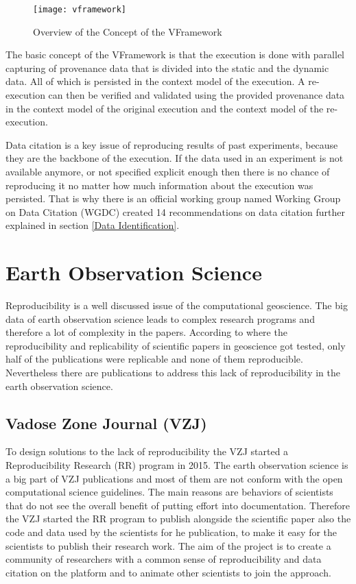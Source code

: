 \documentclass[draft,final]{vutinfth} %
\begin{document}
\begin{figure}[h]
	\centering
	\texttt{[image: vframework]}
	\caption{Overview of the Concept of the VFramework \cite{Miksa2013FrameworkFV}}
	\label{fig:vframework} %
\end{figure}

The basic concept of the VFramework is that the execution is done with parallel capturing of provenance data that is divided into the static and the dynamic data. All of which is persisted in the context model of the execution. A re-execution can then be verified and validated using the provided provenance data in the context model of the original execution and the context model of the re-execution.\cite{Miksa2013FrameworkFV}

Data citation is a key issue of reproducing results of past experiments, because they are the backbone of the execution. If the data used in an experiment is not available anymore, or not specified explicit enough then there is no chance of reproducing it no matter how much information about the execution was persisted. 
That is why there is an official working group named Working Group on Data Citation (WGDC) created 14 recommendations on data citation further explained in section \ref{Data Identification}.

\section{Earth Observation Science}\label{EOScience}

Reproducibility is a well discussed issue of the computational geoscience. The big data of earth observation science leads to complex research programs and therefore a lot of complexity in the papers.  According to \cite{Ostermann2017AdvancingSW} where the reproducibility and replicability of scientific papers in geoscience got tested, only half of the publications were replicable and none of them reproducible. Nevertheless there are publications to address this lack of reproducibility in the earth observation science. 

\subsection{Vadose Zone Journal (VZJ)}\label{VZJ}
To design solutions to the lack of reproducibility the VZJ started a Reproducibility Research (RR) program in 2015. \cite{doi:10.2136/vzj2015.06.0088}
The earth observation science is a big part of VZJ publications and most of them are not conform with the open computational science guidelines. The main reasons are behaviors of scientists that do not see the overall benefit of putting effort into documentation. Therefore the VZJ started the RR program to publish alongside the scientific paper also the code and data used by the scientists for he publication, to make it easy for the scientists to publish their research work. The aim of the project is to create a community of researchers with a common sense of reproducibility and data citation on the platform and to animate other scientists to join the approach. \cite{doi:10.2136/vzj2015.06.0088}
\end{document}
